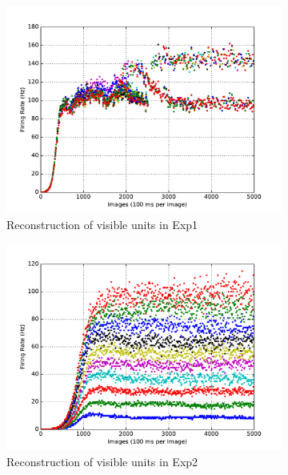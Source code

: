 \begin{figure}
\begin{subfigure}[t]{0.4\textwidth}
		\includegraphics[width=\textwidth]{pics_sdlm/11_exp_SRBM_Orig_long/exp1_recon_s.pdf}
		\caption{Reconstruction of visible units in Exp1}
	\end{subfigure}
	\begin{subfigure}[t]{0.4\textwidth}
		\includegraphics[width=\textwidth]{pics_sdlm/11_exp_SRBM_Orig_long/exp2_recon_s.pdf}
		\caption{Reconstruction of visible units in Exp2}
	\end{subfigure}\\
	\begin{subfigure}[t]{0.4\textwidth}

\end{subfigure}
\end{figure}
